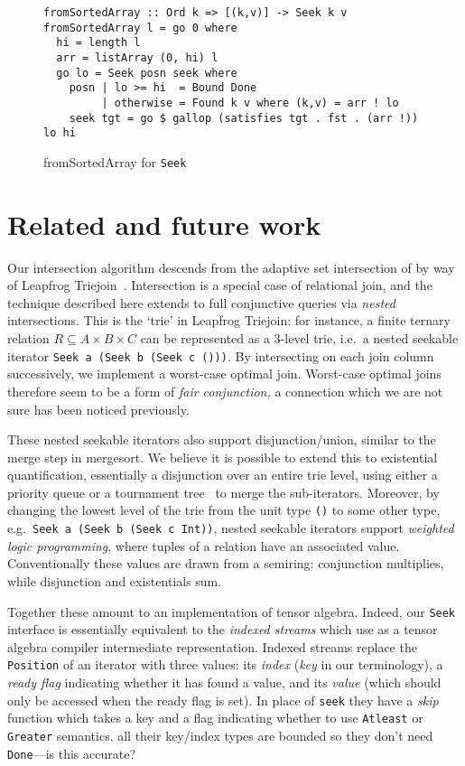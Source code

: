\documentclass[acmsmall,screen,dvipsnames,svgnames]{acmart}
\newcommand\hask[1]{\texttt{#1}}
\newcommand\ttt\texttt
\newcommand\todo[1]{{\color{Orange}#1}}
\renewcommand\todo[1]{{\color{IndianRed}#1}}
\newcommand\oldtodo[1]{\todo{#1}}
\begin{document}
\begin{figure}
  \begin{verbatim}
fromSortedArray :: Ord k => [(k,v)] -> Seek k v
fromSortedArray l = go 0 where
  hi = length l
  arr = listArray (0, hi) l
  go lo = Seek posn seek where
    posn | lo >= hi  = Bound Done
         | otherwise = Found k v where (k,v) = arr ! lo
    seek tgt = go $ gallop (satisfies tgt . fst . (arr !)) lo hi
  \end{verbatim}
  \caption{fromSortedArray for \hask{Seek}}
  \label{fig:seek-fromsortedarray}
\end{figure}


\section{Related and future work}

Our intersection algorithm descends from the adaptive set intersection of \citet{DBLP:conf/soda/DemaineLM00} by way of Leapfrog Triejoin~\citep{lftj}.
%
Intersection is a special case of relational join, and the technique described here extends to full conjunctive queries via \emph{nested} intersections.
This is the `trie' in Leapfrog Triejoin: for instance, a finite ternary relation $R \subseteq A \times B \times C$ can be represented as a 3-level trie, i.e.\ a nested seekable iterator \hask{Seek a (Seek b (Seek c ()))}.
By intersecting on each join column successively, we implement a worst-case optimal join.
Worst-case optimal joins therefore seem to be a form of \emph{fair conjunction,} a connection which we are not sure has been noticed previously.

These nested seekable iterators also support disjunction/union, similar to the merge step in mergesort.
We believe it is possible to extend this to existential quantification, essentially a disjunction over an entire trie level, using either a priority queue or a tournament tree~\citep[Chapter 5.4.1]{DBLP:books/lib/Knuth98a} to merge the sub-iterators.
Moreover, by changing the lowest level of the trie from the unit type \ttt{()} to some other type, e.g.\ \hask{Seek a (Seek b (Seek c Int))}, nested seekable iterators support \emph{weighted logic programming}, where tuples of a relation have an associated value.
Conventionally these values are drawn from a semiring: conjunction multiplies, while disjunction and existentials sum.

Together these amount to an implementation of tensor algebra.
Indeed, our \hask{Seek} interface is essentially equivalent to the \emph{indexed streams} which \citet{indexed-streams} use as a tensor algebra compiler intermediate representation.
Indexed streams replace the \hask{Position} of an iterator with three values: its \emph{index} (\emph{key} in our terminology), a \emph{ready flag} indicating whether it has found a value, and its \emph{value} (which should only be accessed when the ready flag is set).
In place of \hask{seek} they have a \emph{skip} function which takes a key and a flag indicating whether to use \hask{Atleast} or \hask{Greater} semantics.
\oldtodo{all their key/index types are bounded so they don't need \hask{Done}---is this accurate?}
\end{document}
